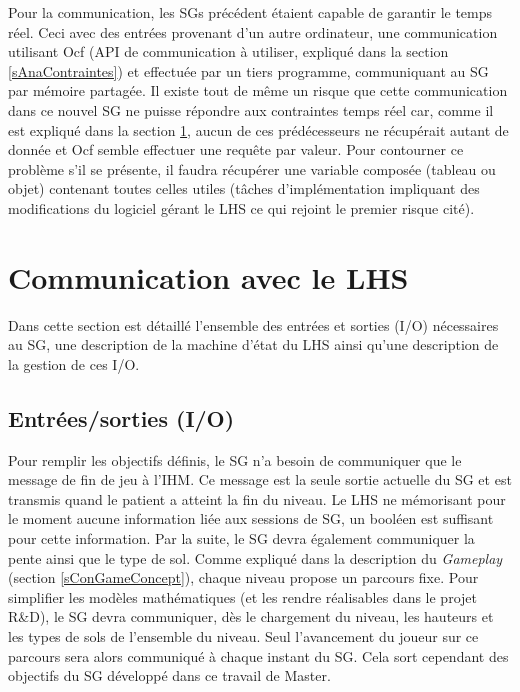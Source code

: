 		Pour la communication, les SGs précédent étaient capable de garantir le temps réel. Ceci avec des entrées provenant d'un autre ordinateur, une communication utilisant Ocf \cite{OcfClient_website} (API de communication à utiliser, expliqué dans la section \ref{sAnaContraintes}) et effectuée par un tiers programme, communiquant au SG par mémoire partagée. Il existe tout de même un risque que cette communication dans ce nouvel SG ne puisse répondre aux contraintes temps réel car, comme il est expliqué dans la section \ref{sConCommunication}, aucun de ces prédécesseurs ne récupérait autant de donnée et Ocf  \cite{OcfClient_website} semble effectuer une requête par valeur. Pour contourner ce problème s'il se présente, il faudra récupérer une variable composée (tableau ou objet) contenant toutes celles utiles (tâches d'implémentation impliquant des modifications du logiciel gérant le LHS ce qui rejoint le premier risque cité).
			
	
		
\section{Communication avec le LHS}
	\label{sConCommunication}
	Dans cette section est détaillé l'ensemble des entrées et sorties (I/O) nécessaires au SG, une description de la machine d'état du LHS ainsi qu'une description de la gestion de ces I/O.
	
	\subsection*{Entrées/sorties (I/O)}
		Pour remplir les objectifs définis, le SG n'a besoin de communiquer que le message de fin de jeu à l'IHM. Ce message est la seule sortie actuelle du SG et est transmis quand le patient a atteint la fin du niveau. Le LHS ne mémorisant pour le moment aucune information liée aux sessions de SG, un booléen est suffisant pour cette information. Par la suite, le SG devra également communiquer la pente ainsi que le type de sol. Comme expliqué dans la description du \textit{Gameplay} (section \ref{sConGameConcept}), chaque niveau propose un parcours fixe. Pour simplifier les modèles mathématiques (et les rendre réalisables dans le projet R\&D), le SG devra communiquer, dès le chargement du niveau, les hauteurs et les types de sols de l'ensemble du niveau. Seul l'avancement du joueur sur ce parcours sera alors communiqué à chaque instant du SG. Cela sort cependant des objectifs du SG développé dans ce travail de Master.
		\\
		
